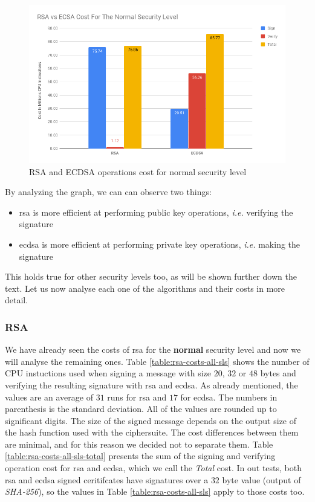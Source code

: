\documentclass{llncs}
\begin{document}
\begin{figure}
  \centering
  \includegraphics[width=1.0\textwidth]{img/rsa_ecdsa_cost_normal_sl.png}
  \caption{\label{fig:rsa-ecdsa-sign-ver-total-normal-sl} RSA and ECDSA operations cost for normal security level}
\end{figure}

By analyzing the graph, we can can observe two things:

\begin{itemize}
  \item \gls{rsa} is more efficient at performing public key operations, \textit{i.e.} verifying the signature
  \item \gls{ecdsa} is more efficient at performing private key operations, \textit{i.e.} making the signature
\end{itemize}

This holds true for other security levels too, as will be shown further down the text. Let us now analyse each one
of the algorithms and their costs in more detail. 

\subsubsection{RSA}

We have already seen the costs of \gls{rsa} for the \textbf{normal} security level and now we will analyse the
remaining ones. Table \ref{table:rsa-costs-all-sls} shows the number of CPU instuctions used
when signing a message with size $20$, $32$ or $48$ bytes and verifying the resulting signature with \gls{rsa} and \gls{ecdsa}.
As already mentioned, the values are an average of $31$ runs for \gls{rsa} and $17$ for \gls{ecdsa}.
The numbers in parenthesis is the standard deviation. All of the values are rounded up to significant digits. The size of the signed message depends on the output size of the
hash function used with the ciphersuite. The cost differences between them are minimal, and for this reason we decided not to separate them.
Table \ref{table:rsa-costs-all-sls-total} presents the sum of the signing and verifying operation cost for \gls{rsa} and \gls{ecdsa}, which we call the \textit{Total} cost. 
In out tests, both \gls{rsa} and \gls{ecdsa} signed ceritifcates have signatures over a $32$ byte value (output of \textit{SHA-256}), so
the values in Table \ref{table:rsa-costs-all-sls} apply to those costs too.
\end{document}
